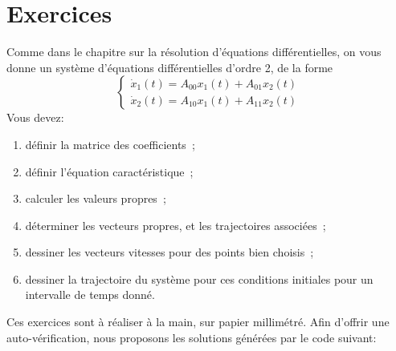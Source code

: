     \section{Exercices}
        Comme dans le chapitre sur la résolution d'équations différentielles, on vous donne un système d'équations différentielles d'ordre 2, de la forme
        \begin{equation}
            \begin{cases}
                \dot{x}_1(t) = A_{00} x_1(t) + A_{01} x_2(t)\\
                \dot{x}_2(t) = A_{10} x_1(t) + A_{11} x_2(t)
            \end{cases}
        \end{equation}
        Vous devez:
        \begin{enumerate}
            \item définir la matrice des coefficients~;
            \item définir l'équation caractéristique~;
            \item calculer les valeurs propres~;
            \item déterminer les vecteurs propres, et les trajectoires associées~;
            \item dessiner les vecteurs vitesses pour des points bien choisis~;
            \item dessiner la trajectoire du système pour ces conditions initiales pour un intervalle de temps donné.
        \end{enumerate}
        Ces exercices sont à réaliser à la main, sur papier millimétré. Afin d'offrir une auto-vérification, nous proposons les solutions générées par le code suivant:
        \inputminted{python}{codes/correction_pdp_1.py}
        
